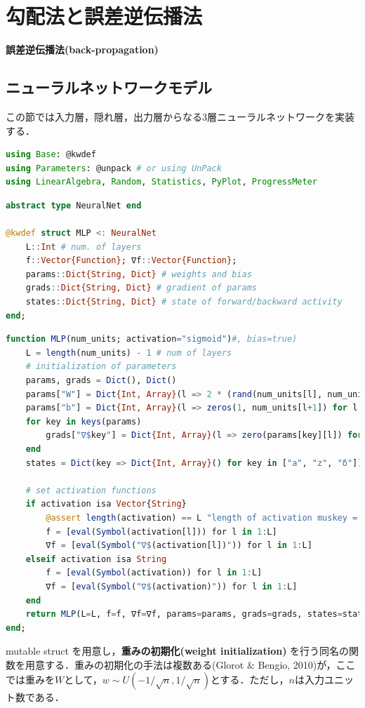 \section{勾配法と誤差逆伝播法}
\textbf{誤差逆伝播法(back-propagation)}
\subsection{ニューラルネットワークモデル}
この節では入力層，隠れ層，出力層からなる3層ニューラルネットワークを実装する．
\begin{lstlisting}[language=julia]
using Base: @kwdef
using Parameters: @unpack # or using UnPack
using LinearAlgebra, Random, Statistics, PyPlot, ProgressMeter
\end{lstlisting}
\begin{lstlisting}[language=julia]
abstract type NeuralNet end

@kwdef struct MLP <: NeuralNet
    L::Int # num. of layers
    f::Vector{Function}; ∇f::Vector{Function};
    params::Dict{String, Dict} # weights and bias
    grads::Dict{String, Dict} # gradient of params
    states::Dict{String, Dict} # state of forward/backward activity
end;
\end{lstlisting}
\begin{lstlisting}[language=julia]
function MLP(num_units; activation="sigmoid")#, bias=true)
    L = length(num_units) - 1 # num of layers
    # initialization of parameters
    params, grads = Dict(), Dict()
    params["W"] = Dict{Int, Array}(l => 2 * (rand(num_units[l], num_units[l+1]) .- 0.5) / sqrt(num_units[l]) for l in 1:L)
    params["b"] = Dict{Int, Array}(l => zeros(1, num_units[l+1]) for l in 1:L)
    for key in keys(params)
        grads["∇$key"] = Dict{Int, Array}(l => zero(params[key][l]) for l in 1:L)
    end
    states = Dict(key => Dict{Int, Array}() for key in ["a", "z", "δ"])

    # set activation functions
    if activation isa Vector{String}
        @assert length(activation) == L "length of activation muskey = t be equal to L=$L, or use string"
        f = [eval(Symbol(activation[l])) for l in 1:L]
        ∇f = [eval(Symbol("∇$(activation[l])")) for l in 1:L]
    elseif activation isa String
        f = [eval(Symbol(activation)) for l in 1:L]
        ∇f = [eval(Symbol("∇$(activation)")) for l in 1:L]
    end
    return MLP(L=L, f=f, ∇f=∇f, params=params, grads=grads, states=states)
end;
\end{lstlisting}
mutable struct を用意し，\textbf{重みの初期化(weight initialization)} を行う同名の関数を用意する．重みの初期化の手法は複数ある(Glorot & Bengio, 2010)が，ここでは重みを$W$として，$w \sim U\left(-1/\sqrt{n}, 1/\sqrt{n}\right)$とする．ただし，$n$は入力ユニット数である．
